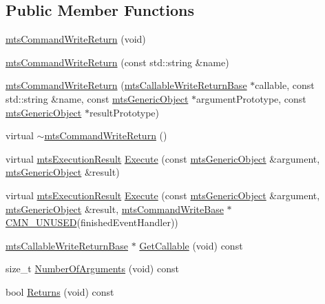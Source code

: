 \subsection*{Public Member Functions}
\begin{DoxyCompactItemize}
\item 
\hyperlink{classmts_command_write_return_a75d7e811da35c3d35a5381d81a723c47}{mts\-Command\-Write\-Return} (void)
\item 
\hyperlink{classmts_command_write_return_a0a42bcea06e94e241b7ee5947db9516b}{mts\-Command\-Write\-Return} (const std\-::string \&name)
\item 
\hyperlink{classmts_command_write_return_a9a99d50207c9f07bd1b1bfe1e5d17ea6}{mts\-Command\-Write\-Return} (\hyperlink{classmts_callable_write_return_base}{mts\-Callable\-Write\-Return\-Base} $\ast$callable, const std\-::string \&name, const \hyperlink{classmts_generic_object}{mts\-Generic\-Object} $\ast$argument\-Prototype, const \hyperlink{classmts_generic_object}{mts\-Generic\-Object} $\ast$result\-Prototype)
\item 
virtual \hyperlink{classmts_command_write_return_a8ef9183a99d604da8e0397728eef559b}{$\sim$mts\-Command\-Write\-Return} ()
\item 
virtual \hyperlink{classmts_execution_result}{mts\-Execution\-Result} \hyperlink{classmts_command_write_return_ad836d1667d7fde4f697ce63e69e0551a}{Execute} (const \hyperlink{classmts_generic_object}{mts\-Generic\-Object} \&argument, \hyperlink{classmts_generic_object}{mts\-Generic\-Object} \&result)
\item 
virtual \hyperlink{classmts_execution_result}{mts\-Execution\-Result} \hyperlink{classmts_command_write_return_a83c18f90db8e763b0d001036e0733f66}{Execute} (const \hyperlink{classmts_generic_object}{mts\-Generic\-Object} \&argument, \hyperlink{classmts_generic_object}{mts\-Generic\-Object} \&result, \hyperlink{classmts_command_write_base}{mts\-Command\-Write\-Base} $\ast$\hyperlink{cmn_portability_8h_a021894e2626935fa2305434b1e893ff6}{C\-M\-N\-\_\-\-U\-N\-U\-S\-E\-D}(finished\-Event\-Handler))
\item 
\hyperlink{classmts_callable_write_return_base}{mts\-Callable\-Write\-Return\-Base} $\ast$ \hyperlink{classmts_command_write_return_ac4b99a5f03b3a1f0f47171b242be6ede}{Get\-Callable} (void) const 
\item 
size\-\_\-t \hyperlink{classmts_command_write_return_aee8e85348044dd4e5b033951bc5e06d9}{Number\-Of\-Arguments} (void) const 
\item 
bool \hyperlink{classmts_command_write_return_a8c026dc9a27616a9ed5714b43ffb9e98}{Returns} (void) const 

\end{DoxyCompactItemize}
